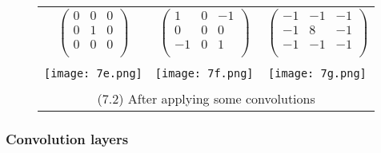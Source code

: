 \begin{figure}[h]
  \centering
  \begin{tabular}{ccc}
    $ \begin{pmatrix}
      0 & 0 & 0 \\
      0 & 1 & 0 \\
      0 & 0 & 0 \\
    \end{pmatrix} $ &
    $ \begin{pmatrix}
      1 & 0 & -1 \\
      0 & 0 & 0 \\
      -1 & 0 & 1 \\
    \end{pmatrix} $ &
    $ \begin{pmatrix}
      -1 & -1 & -1 \\
      -1 & 8 & -1 \\
      -1 & -1 & -1 \\
    \end{pmatrix} $ \\
    & & \\
    \texttt{[image: 7e.png]} &
    \texttt{[image: 7f.png]} &
    \texttt{[image: 7g.png]} \\
    & & \\
    \multicolumn{3}{c}{(7.2) After applying some convolutions}
  \end{tabular}
\end{figure}

\subsubsection*{Convolution layers}

